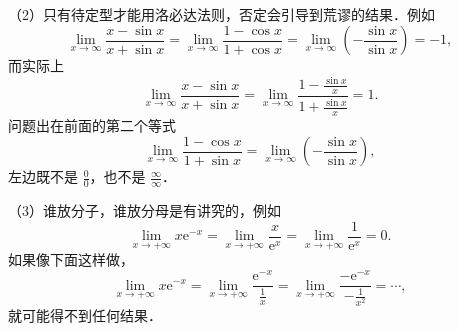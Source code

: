（2）只有待定型才能用洛必达法则，否定会引导到荒谬的结果．例如
\[
\lim_{x\to\infty}\frac{x - \sin x}{x + \sin x}
= \lim_{x\to\infty}\frac{1 - \cos x}{1 + \cos x}
= \lim_{x\to\infty}\left(-\frac{\sin x}{\sin x}\right) = -1,
\]
而实际上
\[
\lim_{x\to\infty}\frac{x - \sin x}{x + \sin x}
= \lim_{x\to\infty}\frac{1 - \frac{\sin x}{x}}{1 + \frac{\sin x}{x}} = 1.
\]
问题出在前面的第二个等式
\[
\lim_{x\to\infty}\frac{1 - \cos x}{1 + \sin x}
= \lim_{x\to\infty}\left(-\frac{\sin x}{\sin x}\right),
\]
左边既不是 $\frac{0}{0}$，也不是 $\frac{\infty}{\infty}$．

（3）谁放分子，谁放分母是有讲究的，例如
\[
\lim_{x\to+\infty} x\mathrm{e}^{-x}
= \lim_{x\to+\infty}\frac{x}{\mathrm{e}^{x}}
= \lim_{x\to+\infty}\frac{1}{\mathrm{e}^{x}} = 0.
\]
如果像下面这样做，
\[
\lim_{x\to+\infty} x\mathrm{e}^{-x}
= \lim_{x\to+\infty}\frac{\mathrm{e}^{-x}}{\frac{1}{x}}
= \lim_{x\to+\infty}\frac{-\mathrm{e}^{-x}}{-\frac{1}{x^{2}}} = \cdots,
\]
就可能得不到任何结果．

